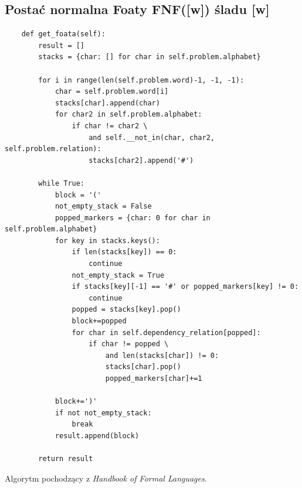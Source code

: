 \documentclass{article}
\begin{document}
        \subsection{Postać normalna Foaty FNF([w]) śladu [w]}
            \begin{lstlisting}
    def get_foata(self):
        result = []
        stacks = {char: [] for char in self.problem.alphabet}

        for i in range(len(self.problem.word)-1, -1, -1):
            char = self.problem.word[i]
            stacks[char].append(char)
            for char2 in self.problem.alphabet:
                if char != char2 \
                    and self.__not_in(char, char2, self.problem.relation):
                    stacks[char2].append('#')

        while True:
            block = '('
            not_empty_stack = False
            popped_markers = {char: 0 for char in self.problem.alphabet}
            for key in stacks.keys():
                if len(stacks[key]) == 0:
                    continue
                not_empty_stack = True
                if stacks[key][-1] == '#' or popped_markers[key] != 0:
                    continue
                popped = stacks[key].pop()
                block+=popped
                for char in self.dependency_relation[popped]:
                    if char != popped \
                        and len(stacks[char]) != 0:
                        stacks[char].pop()
                        popped_markers[char]+=1

            block+=')'
            if not not_empty_stack:
                break
            result.append(block)

        return result
            \end{lstlisting}
            Algorytm pochodzący z \textit{Handbook of Formal Languages}. 
            
\end{document}
